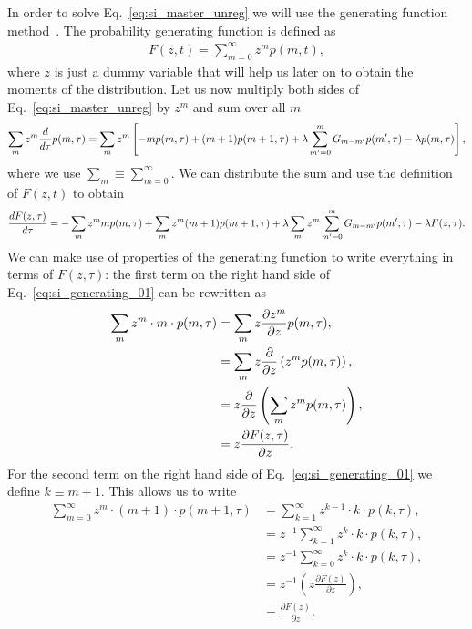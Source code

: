 In order to solve Eq.~\ref{eq:si_master_unreg} we will use the generating
function method~\cite{vanKampen2007}. The probability generating function
is defined as
\begin{align}
F(z,t) = \sum_{m=0}^\infty z^m p(m,t),
\end{align}
where $z$ is just a dummy variable that will help us later on to obtain the
moments of the distribution. Let us now multiply both sides of
Eq.~\ref{eq:si_master_unreg} by $z^m$ and sum over all $m$
\begin{equation}
\sum_m z^m {d \over d\tau} p(m, \tau) = 
\sum_m z^m \left[ 
- m p(m, \tau) 
+ (m + 1) p(m + 1, \tau) 
+ \lambda \sum_{m' = 0}^m G_{m-m'} p(m', \tau) - \lambda p(m, \tau)
\right],
\end{equation}
where we use $\sum_m \equiv \sum_{m=0}^\infty$. We can distribute the sum and
use the definition of $F(z, t)$ to obtain
\begin{equation}
{d F(z, \tau) \over d\tau} =
- \sum_m z^m m p(m, \tau)
+ \sum_m z^m (m + 1) p(m + 1, \tau)
+ \lambda \sum_m z^m \sum_{m'=0}^m G_{m-m'} p(m', \tau)
- \lambda F(z, \tau).
\label{eq:si_generating_01}
\end{equation}
We can make use of properties of the generating function to write everything in
terms of $F(z, \tau)$: the first term on the right hand side of
Eq.~\ref{eq:si_generating_01} can be rewritten as
\begin{align}
\sum_{m} z^{m} \cdot m \cdot p(m, \tau) &=
\sum_{m} z \frac{\partial z^{m}}{\partial z} p(m, \tau), \\
&=\sum_{m} z \frac{\partial}{\partial z}\left(z^{m} p(m, \tau)\right), \\
&=z \frac{\partial}{\partial z}\left(\sum_{m} z^{m} p(m, \tau)\right), \\
&= z {\partial F(z, \tau) \over \partial z}.
\end{align}
For the second term on the right hand side of Eq.~\ref{eq:si_generating_01} we
define $k \equiv m + 1$. This allows us to write
\begin{align}
\sum_{m=0}^{\infty} z^{m} \cdot(m+1) \cdot p(m+1, \tau) &=
\sum_{k=1}^{\infty} z^{k-1} \cdot k \cdot p(k, \tau), \\
&=z^{-1} \sum_{k=1}^{\infty} z^{k} \cdot k \cdot p(k, \tau), \\
&=z^{-1} \sum_{k=0}^{\infty} z^{k} \cdot k \cdot p(k, \tau), \\
&=z^{-1} \left(z \frac{\partial F(z)}{\partial z}\right), \\
&=\frac{\partial F(z)}{\partial z}.
\end{align}

